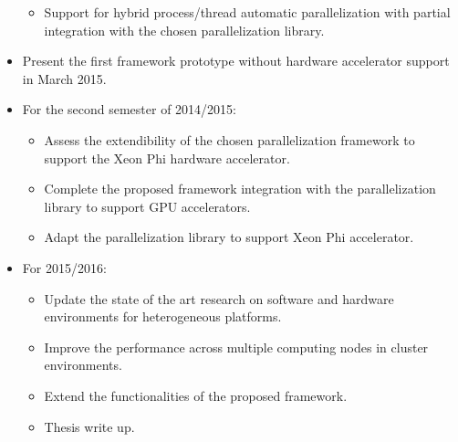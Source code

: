 \begin{itemize}
\begin{itemize}
\begin{itemize}
		\end{itemize}
		\item Support for hybrid process/thread automatic parallelization with partial integration with the chosen parallelization library.
	\end{itemize}
	\item Present the first framework prototype without hardware accelerator support in March 2015.
	\item For the second semester of 2014/2015:
	\begin{itemize}
		\item Assess the extendibility of the chosen parallelization framework to support the \intel Xeon Phi hardware accelerator.
		\item Complete the proposed framework integration with the parallelization library to support GPU accelerators.
		\item Adapt the parallelization library to support \intel Xeon Phi accelerator.
	\end{itemize}
	\item For 2015/2016:
	\begin{itemize}
		\item Update the state of the art research on software and hardware environments for heterogeneous platforms.
		\item Improve the performance across multiple computing nodes in cluster environments.
		\item Extend the functionalities of the proposed framework.
		\item Thesis write up.
	\end{itemize}
\end{itemize}
